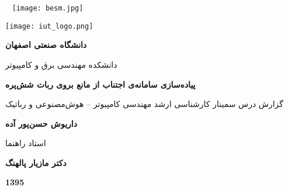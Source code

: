

\thispagestyle{empty}
\mbox{}
\pagebreak

\thispagestyle{empty}
\begin{center}
	~\vfill
	\texttt{[image: besm.jpg]}
	~\vfill
\end{center}
\pagebreak

\thispagestyle{empty}
\begin{center}
\texttt{[image: iut\_logo.png]}
\vspace{0.4cm}

\textbf{دانشگاه صنعتی اصفهان}\\
\vspace{0.4cm}

{\large

	دانشکده مهندسی برق و کامپیوتر
}
\vspace{3.5cm}

{\Large
	\textbf{پیاده‌سازی سامانه‌ی اجتناب از مانع بروی ربات شش‌پره}\\
}
\vspace{3.5cm}

{\Large
	گزارش درس سمینار کارشناسی ارشد مهندسی کامپیوتر -- هوش‌مصنوعی و رباتیک\\
}
\vspace{1cm}

{\large
	\textbf{داریوش حسن‌پور آده}\\
}
\vspace{3.5cm}

{\large
	استاد راهنما\\
}
\vspace{0.5cm}

{\large
	\textbf{دکتر مازیار پالهنگ}\\
}
\vspace{4cm}

\textbf{1395}

\end{center}
\restoregeometry
\pagebreak

